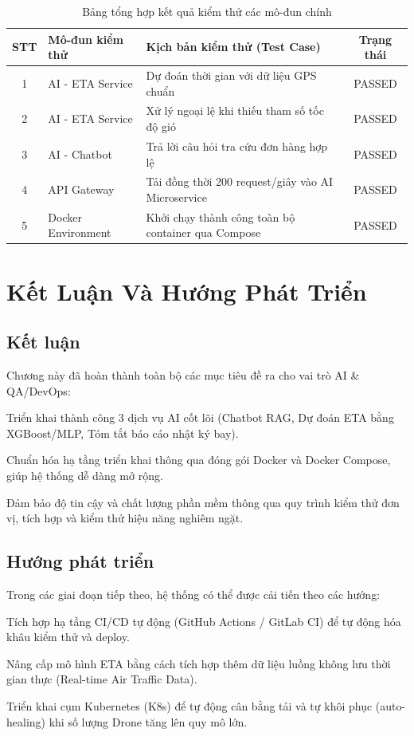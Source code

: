 \begin{table}[h!]
	\centering
	\caption{Bảng tổng hợp kết quả kiểm thử các mô-đun chính}
	\label{tab:test_results}
	\begin{tabular}{|c|l|l|c|}
		\hline
		\textbf{STT} & \textbf{Mô-đun kiểm thử} & \textbf{Kịch bản kiểm thử (Test Case)} & \textbf{Trạng thái} \\ \hline
		1 & AI - ETA Service & Dự đoán thời gian với dữ liệu GPS chuẩn & PASSED \\ \hline
		2 & AI - ETA Service & Xử lý ngoại lệ khi thiếu tham số tốc độ gió & PASSED \\ \hline
		3 & AI - Chatbot & Trả lời câu hỏi tra cứu đơn hàng hợp lệ & PASSED \\ \hline
		4 & API Gateway & Tải đồng thời 200 request/giây vào AI Microservice & PASSED \\ \hline
		5 & Docker Environment & Khởi chạy thành công toàn bộ container qua Compose & PASSED \\ \hline
	\end{tabular}
\end{table}

\section{Kết Luận Và Hướng Phát Triển}

\subsection{Kết luận}
Chương này đã hoàn thành toàn bộ các mục tiêu đề ra cho vai trò AI \& QA/DevOps:

Triển khai thành công 3 dịch vụ AI cốt lõi (Chatbot RAG, Dự đoán ETA bằng XGBoost/MLP, Tóm tắt báo cáo nhật ký bay).

Chuẩn hóa hạ tầng triển khai thông qua đóng gói Docker và Docker Compose, giúp hệ thống dễ dàng mở rộng.

Đảm bảo độ tin cậy và chất lượng phần mềm thông qua quy trình kiểm thử đơn vị, tích hợp và kiểm thử hiệu năng nghiêm ngặt.

\subsection{Hướng phát triển}
Trong các giai đoạn tiếp theo, hệ thống có thể được cải tiến theo các hướng:

Tích hợp hạ tầng CI/CD tự động (GitHub Actions / GitLab CI) để tự động hóa khâu kiểm thử và deploy.

Nâng cấp mô hình ETA bằng cách tích hợp thêm dữ liệu luồng không lưu thời gian thực (Real-time Air Traffic Data).

Triển khai cụm Kubernetes (K8s) để tự động cân bằng tải và tự khôi phục (auto-healing) khi số lượng Drone tăng lên quy mô lớn.


